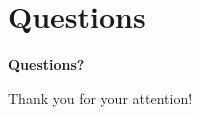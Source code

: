 \section{Questions}

\begin{frame}
    \begin{center}
        \vspace{4em}
        {\huge \textbf{Questions?}}
        
        \vspace{6em}
        {\Large Thank you for your attention!}
    \end{center}
\end{frame}